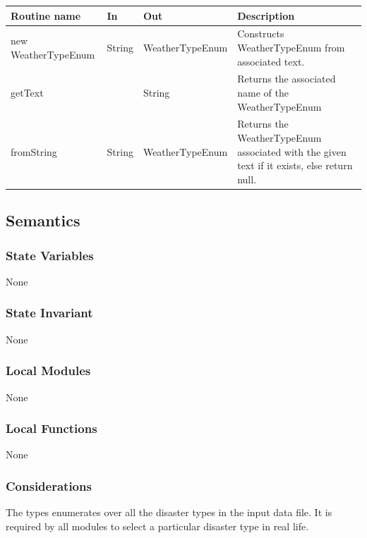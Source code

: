 \documentclass[12pt]{article}
\begin{document}
                \begin{tabular}{| l | l | l | p{5cm} |}
                \hline
                \textbf{Routine name} & \textbf{In} & \textbf{Out} & \textbf{Description}\\
                \hline
                new WeatherTypeEnum & String & WeatherTypeEnum & Constructs WeatherTypeEnum from associated text.\\
                \hline
                 getText & ~ & String & Returns the associated name of the WeatherTypeEnum\\
                \hline
                 fromString & String & WeatherTypeEnum & Returns the WeatherTypeEnum associated with the given text if it exists, else return null.\\
                \hline
                \end{tabular}
                \subsection* {Semantics}
                    \subsubsection *{State Variables} None
                    \subsubsection *{State Invariant} None
                    
                     \subsubsection* {Local Modules}
                     None
                
                \subsubsection*{Local Functions}
                None
                    
                \subsubsection *{Considerations}
                The types enumerates over all the disaster types in the input data file. It is required by all modules to select a particular disaster type in real life.
                \newpage
               
\end{document}
